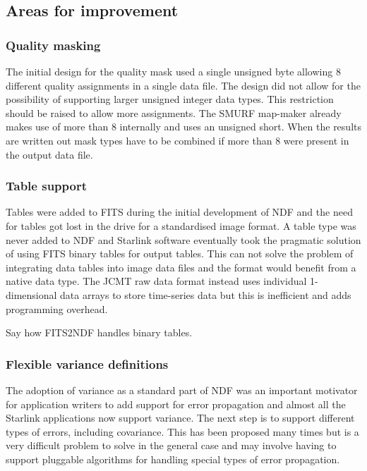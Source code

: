 \documentclass[final,authoryear,5p,times,twocolumn]{elsarticle}
\begin{document}
{\subsection{Areas for improvement}

\subsubsection{Quality masking}

The initial design for the quality mask used a single unsigned byte
allowing 8 different quality assignments in a single data file. The
design did not allow for the possibility of supporting larger unsigned
integer data types. This restriction should be raised to allow more
assignments. The SMURF map-maker
\citep[][ascl:1310.007]{2013MNRAS.430.2545C} already makes use of more
than 8 internally and uses an unsigned short. When the results are
written out mask types have to be combined if more than 8 were present
in the output data file.

\subsubsection{Table support}

Tables were added to FITS \citep{1988A&AS...73..365H} during the
initial development of NDF and the need for tables got lost in the
drive for a standardised image format. A table type was never added to
NDF and Starlink software eventually took the pragmatic solution of
using FITS binary tables \citep{1995A&AS..113..159C} for output
tables. This can not solve the problem of integrating data tables into
image data files and the format would benefit from a native data
type. The JCMT raw data format instead uses individual 1-dimensional
data arrays to store time-series data but this is inefficient and adds
programming overhead.

{\color{red} Say how FITS2NDF handles binary tables.}

\subsubsection{Flexible variance definitions}

The adoption of variance as a standard part of NDF was an important
motivator for application writers to add support for error propagation and
almost all the Starlink applications now support variance. The next
step is to support different types of errors, including
covariance. This has been proposed many times \citep[see
e.g.][]{1991STARB...8...19M} but is a very difficult problem to solve
in the general case and may involve having to support pluggable
algorithms for handling special types of error propagation.

}
\end{document}
